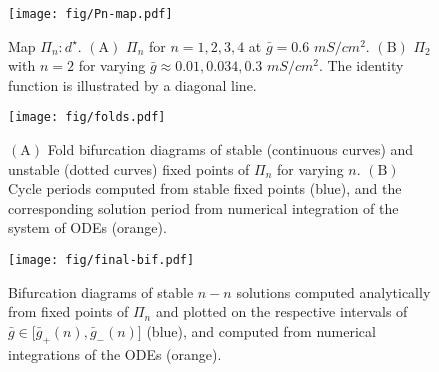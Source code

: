 \documentclass[utf8, draft]{frontiersFPHY} %
\newcommand{\gbar}{\bar g}
\begin{document}
\begin{figure}[h!]
  \centering
  \texttt{[image: fig/Pn-map.pdf]}
  \caption{Map \(\Pi_{n}:d^{\star}\). \(\bm{\mathrm{(A)}}\) \(\Pi_{n}\) for \(n=1,2,3,4\)
  at \(\gbar=0.6\) \(\si{mS/cm^{2}}\). \(\bm{\mathrm{(B)}}\) \(\Pi_{2}\) with \(n=2\) for
  varying \(\gbar \approx 0.01, 0.034, 0.3\) \(\si{mS/cm^{2}}\). The identity function is
  illustrated by a diagonal line.~\label{fig:Pn-map}}
\end{figure}

\begin{figure}[h!]
  \centering
  \texttt{[image: fig/folds.pdf]}
  \caption{\(\bm{\mathrm{(A)}}\) Fold bifurcation diagrams of stable (continuous curves)
    and unstable (dotted curves) fixed points of \(\Pi_{n}\) for varying \(n\).
    \(\bm{\mathrm{(B)}}\) Cycle periods computed from stable fixed points (blue), and the
    corresponding solution period from numerical integration of the system of ODEs
    (orange).~\label{fig:folds}}
\end{figure}

\begin{figure}[h!]
  \centering
  \texttt{[image: fig/final-bif.pdf]}
  \caption{Bifurcation diagrams of stable \(n-n\) solutions computed analytically from
    fixed points of \(\Pi_n\) and plotted on the respective intervals of \(\gbar\in
    \big[\gbar_+(n),\gbar_-(n)\big]\) (blue), and computed from numerical integrations of
    the ODEs (orange).~\label{fig:final-bif}}
\end{figure}
\end{document}
